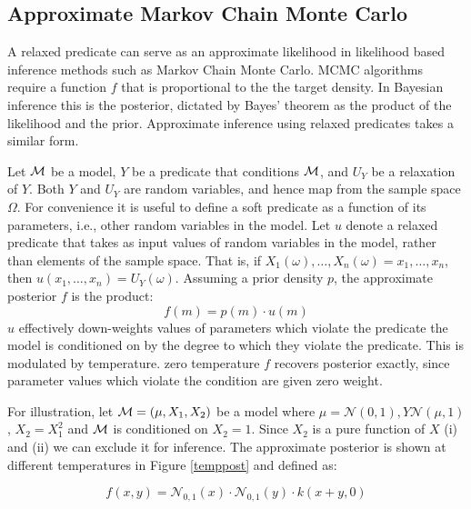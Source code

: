 \subsection{Approximate Markov Chain Monte Carlo}
A relaxed predicate can serve as an approximate likelihood in likelihood based inference methods such as Markov Chain Monte Carlo.
MCMC algorithms require a function $f$ that is proportional to the the target density.
In Bayesian inference this is the posterior, dictated by Bayes' theorem as the product of the likelihood and the prior.
Approximate inference using relaxed predicates takes a similar form.

Let ${\mathcal{M}}$ be a model, $Y$ be a predicate that conditions ${\mathcal{M}}$, and $U_Y$ be a relaxation of $Y$.
Both $Y$ and $U_Y$ are random variables, and hence map from the sample space $\Omega$.
For convenience it is useful to define a soft predicate as a function of its parameters, i.e., other random variables in the model.
Let $u$ denote a relaxed predicate that takes as input values of random variables in the model, rather than elements of the sample space.
That is, if $X_1(\omega), \dots, X_n(\omega) = x_1, \dots, x_n$, then $u(x_1, \dots, x_n) = U_Y(\omega)$.
Assuming a prior density $p$, the approximate posterior $f$ is the product:
\begin{equation}
f(m) = p(m) \cdot u(m)
\end{equation}
$u$ effectively down-weights values of parameters which violate the predicate the model is conditioned on by the  degree to which they violate the predicate. 
This is modulated by temperature.  zero temperature $f$ recovers posterior exactly, since parameter values which violate the condition are given zero weight.

For illustration, let ${\mathcal{M}} = (\mu, X_1, X_2)$ be a model where $\mu = \mathcal{N}(0, 1), Y \mathcal{N}(\mu, 1)$, $X_2 = X_1^2$ and ${\mathcal{M}}$ is conditioned on $X_2 = 1$.
Since $X_2$ is a pure function of $X$ (i) and (ii) we can exclude it for inference.
The approximate posterior is shown at different temperatures in Figure \ref{temppost} and defined as:

$$
f(x, y) = \mathcal{N}_{0,1}(x) \cdot \mathcal{N}_{0,1}(y) \cdot k(x + y, 0) 
$$

